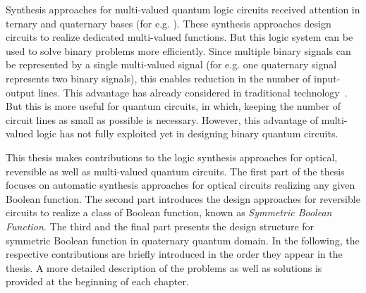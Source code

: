 \documentclass[10pt,letterpaper,twoside,openright]{book}
\begin{document}
Synthesis approaches for multi-valued quantum logic circuits received attention in ternary and quaternary bases (for e.g. \cite{mill06,mrk05,mh07,yang05,mand11,mha06,mha07,mha08,mand12}). These synthesis approaches design circuits to realize dedicated multi-valued functions. But this logic system can be used to solve binary problems more efficiently. Since multiple binary signals can be represented by a single multi-valued signal (for e.g. one quaternary signal represents two binary signals), this enables reduction in the number of input-output lines. This advantage has already considered in traditional technology~\cite{BraytonHSSACEKKPQRSSSV96}. But this is more useful for quantum circuits, in which, keeping the number of circuit lines as small as possible is necessary. However, this advantage of multi-valued logic has not fully exploited yet in designing binary quantum circuits.    
 
This thesis makes contributions to the logic synthesis approaches for optical, reversible as well as multi-valued quantum circuits. The first part of the thesis focuses on automatic synthesis approaches for optical circuits realizing any given Boolean function. The second part introduces the design approaches for reversible circuits to realize a class of Boolean function, known as \emph{Symmetric Boolean Function}. The third and the final part presents the design structure for symmetric Boolean function in quaternary quantum domain. In the following, the respective contributions are briefly introduced in the order they appear in the thesis. A more detailed description of the problems as well as solutions is provided at the beginning of each chapter.      



\end{document}
